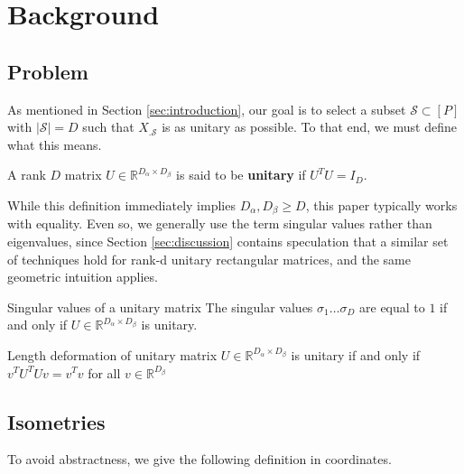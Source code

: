 \documentclass[a4paper,11pt]{article}
\begin{document}
\section{Background}

\subsection{Problem}

As mentioned in Section \ref{sec:introduction}, our goal is to select a subset $\mathcal S \subset [P]$ with $|\mathcal S| = D$ such that $X_{. \mathcal S}$ is as unitary as possible.
To that end, we must define what this means.

\begin{definition}[Unitary]
A rank $D$ matrix $U \in \mathbb R^{D_\alpha \times D_\beta}$ is said to be \textbf{unitary} if $U^TU = I_D$.
\end{definition}

While this definition immediately implies $D_\alpha, D_\beta \geq D$, this paper typically works with equality.
Even so, we generally use the term singular values rather than eigenvalues, since Section \ref{sec:discussion} contains speculation that a similar set of techniques hold for rank-d unitary rectangular matrices, and the same geometric intuition applies.

\begin{proposition}{Singular values of a unitary matrix}
\label{prop:unitary_spectrum}
The singular values $\sigma_1 \dots \sigma_D$ are equal to $1$ if and only if $U \in \mathbb{R}^{D_\alpha \times D_\beta}$ is unitary.
\end{proposition}

\begin{proposition}{Length deformation of unitary matrix}
\label{prop:unitary_spectrum}
$U \in \mathbb{R}^{D_\alpha \times D_\beta}$ is unitary if and only if $v^T  U^T U v = v^T v$ for all $v \in \mathbb R^{D_\beta}$
\end{proposition}


\subsection{Isometries}

To avoid abstractness, we give the following definition in coordinates.
\end{document}
